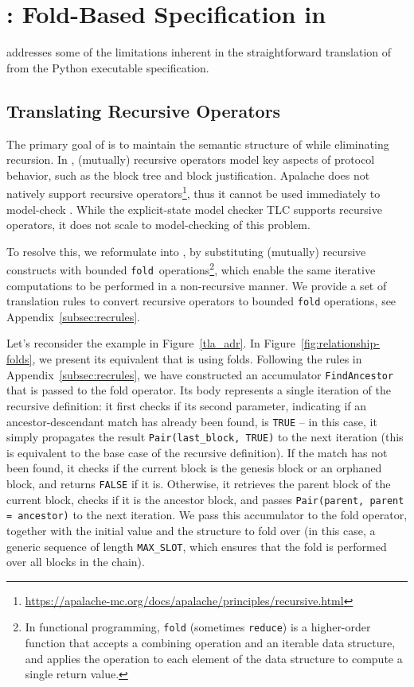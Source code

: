 
\section{\SpecTwo{}: Fold-Based Specification in \tlap{}}\label{sec:spec2}

\SpecTwo{} addresses some of the limitations inherent in the straightforward
translation of \SpecOne{} from the Python executable specification.

\subsection{Translating Recursive \tlap{} Operators}

The primary goal of \SpecTwo{} is to maintain the semantic structure of
\SpecOne{} while eliminating recursion. In \SpecOne{}, (mutually) recursive
operators model key aspects of protocol behavior, such as the block tree and
block justification. Apalache does not natively support recursive
operators\footnote{\url{https://apalache-mc.org/docs/apalache/principles/recursive.html}},
thus it cannot be used immediately to model-check \SpecOne{}. While the
explicit-state \tlap{} model checker TLC supports recursive operators, it does
not scale to model-checking of this problem.

To resolve this, we reformulate \SpecOne{} into \SpecTwo{}, by substituting
(mutually) recursive constructs with bounded
\texttt{fold}~operations\footnote{In functional programming, \texttt{fold} (sometimes \texttt{reduce}) is a
higher-order function that accepts a combining operation and an iterable data
structure, and applies the operation to each element of the data structure
to compute a single return value.}, which enable the same iterative
computations to be performed in a non-recursive manner. We provide a set of
translation rules to convert recursive operators to bounded \texttt{fold}
operations, see Appendix~\ref{subsec:recrules}.

Let's reconsider the example in Figure~\ref{tla_adr}. In
Figure~\ref{fig:relationship-folds}, we present its equivalent that is using
folds. Following the rules in Appendix~\ref{subsec:recrules}, we have
constructed an accumulator \texttt{FindAncestor} that is passed to the fold
operator. Its body represents a single iteration of the recursive definition: it
first checks if its second parameter, indicating if an ancestor-descendant match
has already been found, is \texttt{TRUE} -- in this case, it simply propagates
the result \texttt{Pair(last\_block, TRUE)} to the next iteration (this is
equivalent to the base case of the recursive definition). If the match has not
been found, it checks if the current block is the genesis block or an orphaned
block, and returns \texttt{FALSE} if it is. Otherwise, it retrieves the parent
block of the current block, checks if it is the ancestor block, and passes
\texttt{Pair(parent, parent = ancestor)} to the next iteration. We pass this
accumulator to the fold operator, together with the initial value and the
structure to fold over (in this case, a generic sequence of length
\texttt{MAX\_SLOT}, which ensures that the fold is performed over all blocks in
the chain).



